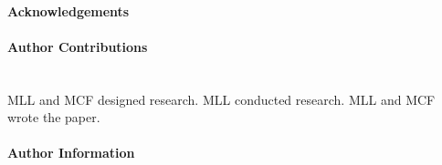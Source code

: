 \documentclass[12pt]{article}
\newcounter{lastnote}
\begin{document}
\paragraph*{Acknowledgements}

\paragraph*{Author Contributions} \mbox{}\\
MLL and MCF designed research. MLL conducted research. MLL and MCF wrote the paper. 

\paragraph*{Author Information}







\clearpage
\end{document}
